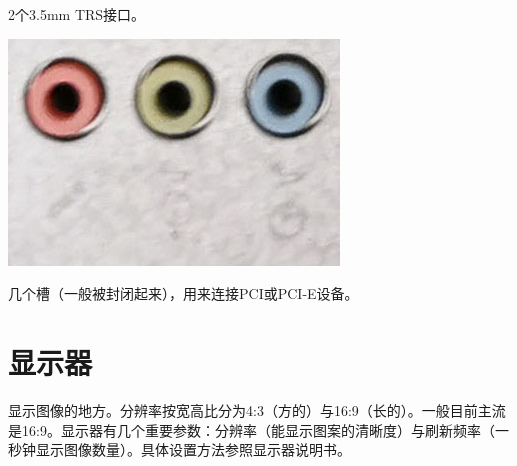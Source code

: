 2个3.5mm TRS接口。
\begin{center}
	\includegraphics[width=0.7\linewidth]{pic/TRS}
\end{center}\par
几个槽（一般被封闭起来），用来连接PCI或PCI-E设备。
\section{显示器}
显示图像的地方。分辨率按宽高比分为4:3（方的）与16:9（长的）。一般目前主流是16:9。显示器有几个重要参数：分辨率（能显示图案的清晰度）与刷新频率（一秒钟显示图像数量）。具体设置方法参照显示器说明书。
